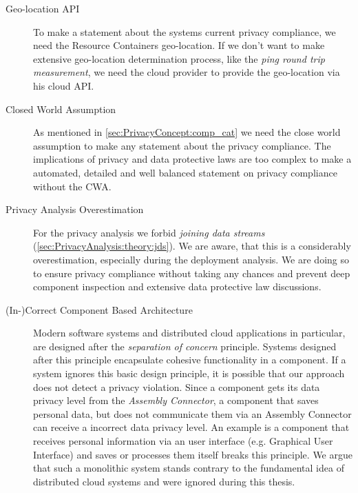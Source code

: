 \begin{description}
	\item[Geo-location API]
	To make a statement about the systems current privacy compliance, we need the Resource Containers geo-location. If we don't want to make extensive geo-location determination process, like the \textit{ping round trip measurement}, we need the cloud provider to provide the geo-location via his cloud API.
\end{description}

\begin{description}
	\item[Closed World Assumption]
	As mentioned in \autoref{sec:PrivacyConcept:comp_cat} we need the close world assumption to make any statement about the privacy compliance. The implications of privacy and data protective laws are too complex to make a automated, detailed and well balanced statement on privacy compliance without the CWA.
\end{description}

\begin{description}
	\item[Privacy Analysis Overestimation]
	For the privacy analysis we forbid \textit{joining data streams} (\autoref{sec:PrivacyAnalysis:theory:jds}). We are aware, that this is a considerably overestimation, especially during the deployment analysis. We are doing so to ensure privacy compliance without taking any chances and prevent deep component inspection and extensive data protective law discussions.
\end{description}

\begin{description}
	\item[(In-)Correct Component Based Architecture]
	Modern software systems and distributed cloud applications in particular, are designed after the \textit{separation of concern} principle. Systems designed after this principle encapsulate cohesive functionality in a component. If a system ignores this basic design principle, it is possible that our approach does not detect a privacy violation. Since a component gets its data privacy level from the \textit{Assembly Connector}, a component that saves personal data, but does not communicate them via an Assembly Connector can receive a incorrect data privacy level. An example is a component that receives personal information via an user interface (e.g. Graphical User Interface) and saves or processes them itself breaks this principle. We argue that such a monolithic system stands contrary to the fundamental idea of distributed cloud systems and were ignored during this thesis.
\end{description}


